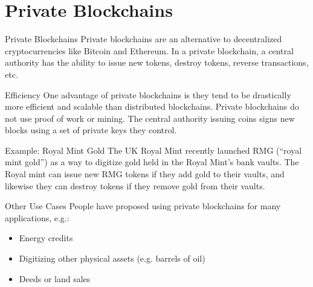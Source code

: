 \documentclass[14pt]{beamer}
\begin{document}

\section{Private Blockchains}

\begin{frame}{Private Blockchains}
  Private blockchains are an alternative to decentralized cryptocurrencies like
  Bitcoin and Ethereum.
  \newline
  \newline
  In a private blockchain, a central authority has the ability to issue new
  tokens, destroy tokens, reverse transactions, etc.
\end{frame}

\begin{frame}{Efficiency}
  One advantage of private blockchains is they tend to be drastically more
  efficient and scalable than distributed blockchains.
  \newline
  \newline
  Private blockchains do not use proof of work or mining. The central authority
  issuing coins signs new blocks using a set of private keys they control.
\end{frame}

\begin{frame}{Example: Royal Mint Gold}
  The UK Royal Mint recently launched RMG (``royal mint gold'') as a way to
  digitize gold held in the Royal Mint's bank vaults.
  \newline
  \newline
  The Royal mint can issue new RMG tokens if they add gold to their vaults, and
  likewise they can destroy tokens if they remove gold from their vaults.
\end{frame}

\begin{frame}{Other Use Cases}
  People have proposed using private blockchains for many applications, e.g.:
  \begin{itemize}
  \item Energy credits
  \item Digitizing other physical assets (e.g. barrels of oil)
  \item Deeds or land sales
  \end{itemize}
  \end{frame}
\end{document}
